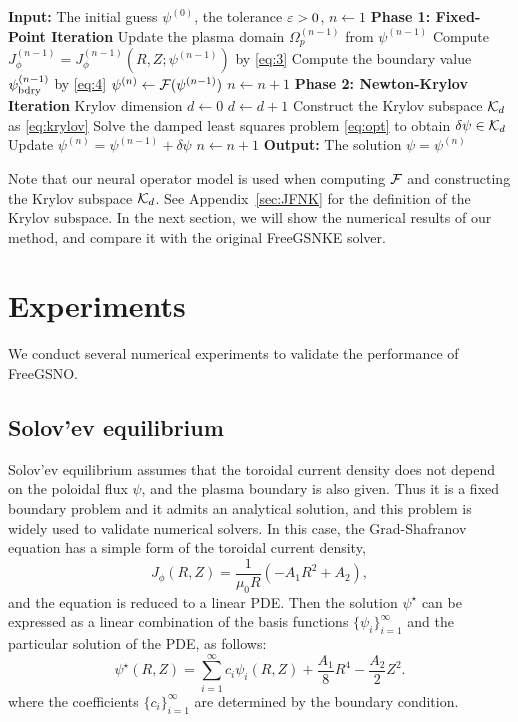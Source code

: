 \begin{algorithm}
  \begin{algorithmic}
    \STATE \textbf{Input:} The initial guess $\psi^{(0)}$, the tolerance $\ep > 0$,
    $n \gets 1$
    \STATE \textbf{Phase 1: Fixed-Point Iteration}
      \STATE Update the plasma domain $\Omega_p^{(n-1)}$ from $\psi^{(n-1)}$
      \STATE Compute $J_\phi^{(n-1)} = J_\phi^{(n-1)}(R, Z; \psi^{(n-1)})$ by \eqref{eq:3}
      \STATE Compute the boundary value $\psi_{\rm{bdry}}^{(n-1)}$ by \eqref{eq:4}
      \STATE $\psi^{(n)} \gets \cal{F}(\psi^{(n-1)})$
      \STATE $n \gets n + 1$
    \ENDWHILE
    \STATE \textbf{Phase 2: Newton-Krylov Iteration}
      \STATE Krylov dimension $d \gets 0$ 
        \STATE $d \gets d + 1$
        \STATE Construct the Krylov subspace $\cal{K}_d$ as \eqref{eq:krylov}
        \STATE Solve the damped least squares problem \eqref{eq:opt} to obtain 
        $\delta \psi \in \cal{K}_d$
      \ENDWHILE
      \STATE Update $\psi^{(n)} = \psi^{(n-1)} + \delta \psi$
      \STATE $n \gets n + 1$
    \ENDWHILE
    \STATE \textbf{Output:} The solution $\psi = \psi^{(n)}$ 
  \end{algorithmic}
  \caption{Two-Phase Iterative Method for Solving the Grad-Shafranov Equation}
  \label{alg:1}
\end{algorithm}

Note that our neural operator model is used when computing $\cal{F}$ and 
constructing the Krylov subspace $\cal{K}_d$. See Appendix~\ref{sec:JFNK} for 
the definition of the Krylov subspace.
In the next section, we will show the numerical results of our method, 
and compare it with the original FreeGSNKE solver.

\section{Experiments} \label{sec:5}

We conduct several numerical experiments to validate the performance of FreeGSNO.

\subsection{Solov'ev equilibrium}

Solov'ev equilibrium assumes that the toroidal current density does not depend on
the poloidal flux $\psi$, and the plasma boundary is also given. 
Thus it is a fixed boundary problem and it admits an analytical solution,
and this problem is widely used to validate numerical solvers.
In this case, the Grad-Shafranov equation has a simple form of the toroidal 
current density, 
\[ J_\phi(R, Z) = \frac{1}{\mu_0 R} (- A_1 R^2 + A_2), \]
and the equation is reduced to a linear PDE.
Then the solution $\psi^\star$ can be expressed as a linear combination of the basis functions \cite{Solovev}
$\{\psi_i\}_{i=1}^\infty$ and the particular solution of the PDE, as follows:
\[ \psi^\star(R, Z) = \sum_{i=1}^\infty c_i \psi_i(R, Z) + \frac{A_1}{8}R^4 - \frac{A_2}{2}Z^2.\]
where the coefficients $\{c_i\}_{i=1}^\infty$ are determined by the boundary condition.

